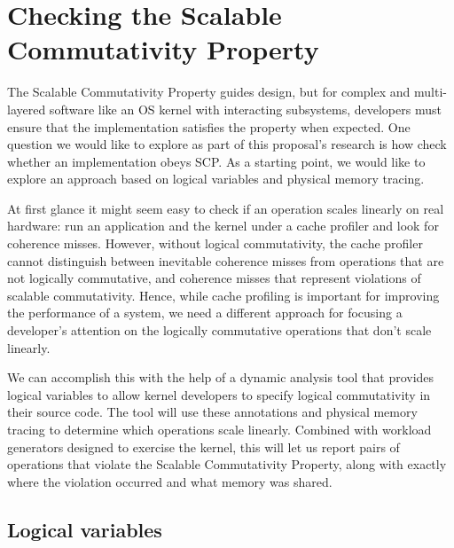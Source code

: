 \section{Checking the Scalable Commutativity Property}
\label{s:checker}

The Scalable Commutativity Property guides design, but for complex and
multi-layered software like an OS kernel with interacting subsystems, developers must
ensure that the implementation satisfies the property when expected.  One
question we would like to explore as part of this proposal's research is how
check whether an implementation obeys SCP.  As a starting point, we would like
to explore an approach based on logical variables and physical memory tracing.

At first glance it might seem easy to check if an operation scales linearly
on real hardware: run an application and the kernel under a cache profiler
and look for coherence misses.  However, without logical
commutativity, the cache profiler cannot distinguish between inevitable
coherence misses from operations that are not logically commutative, and
coherence misses that represent violations of scalable commutativity.  Hence,
while cache profiling is important for improving the performance of a system, we
need a different approach for focusing a developer's attention on the logically
commutative operations that don't scale linearly.

We can accomplish this with the help of a dynamic analysis tool that provides
logical variables to allow kernel developers to specify logical commutativity in
their source code.  The tool will use these annotations and physical memory tracing
to determine which operations scale linearly.  Combined with workload
generators designed to exercise the kernel, this will let us report pairs of
operations that violate the Scalable Commutativity Property, along with exactly
where the violation occurred and what memory was shared.

\subsection{Logical variables}
\label{sec:logicvar}


